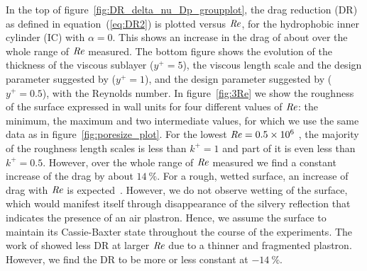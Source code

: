 In the top of figure~\ref{fig:DR_delta_nu_Dp_groupplot}, the drag reduction (DR) as defined in equation~(\ref{eq:DR2}) is plotted versus $\mbox{\textit{Re}}$, for the {hydrophobic} inner cylinder (IC) with $\alpha = 0$. This shows an increase in the drag of about  over the whole range of $\mbox{\textit{Re}}$ measured. The bottom figure shows the evolution of the thickness of the viscous sublayer ($y^+ = 5$), the viscous length scale and the design parameter suggested by \cite{Park2014} ($y^+ = 1$), and the design parameter suggested by \cite{Bidkar2014} ($y^+ = 0.5$), with the Reynolds number. In figure~\ref{fig:3Re} we show the roughness of the surface expressed in wall units for four different values of $\mbox{\textit{Re}}$: the minimum, the maximum and two intermediate values, for which we use the same data as in figure~\ref{fig:poresize_plot}. For the lowest $\mbox{\textit{Re}} = 0.5 \times 10^6$ , the majority of the roughness length scales is less than $k^+ = 1$ and part of it is even less than $k^+ = 0.5$. However, over the whole range of $\mbox{\textit{Re}}$ measured we find a constant increase of the drag by about $\SI{14}{\%}$. For a rough, wetted surface, an increase of drag with $\mbox{\textit{Re}}$ is expected~\citep{Flack2010}. However, we do not observe wetting of the surface, which would manifest itself through disappearance of the silvery reflection that indicates the presence of an air plastron. Hence, we assume the surface to maintain its Cassie-Baxter state throughout the course of the experiments.  The work of \cite{Reholon2018} showed less DR at larger $\mbox{\textit{Re}}$ due to a thinner and fragmented plastron. However, we find the DR to be more or less constant at $\SI{-14}{\percent}$. 

